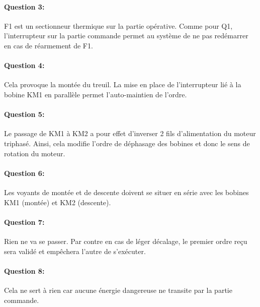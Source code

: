 \paragraph{Question 3:} F1 est un sectionneur thermique sur la partie opérative. Comme pour Q1, l'interrupteur sur la partie commande permet au système de ne pas redémarrer en cas de réarmement de F1.

\paragraph{Question 4:} Cela provoque la montée du treuil. La mise en place de l'interrupteur lié à la bobine KM1 en parallèle permet l'auto-maintien de l'ordre.

\paragraph{Question 5:} Le passage de KM1 à KM2 a pour effet d'inverser 2 fils d'alimentation du moteur triphasé. Ainsi, cela modifie l'ordre de déphasage des bobines et donc le sens de rotation du moteur.

\paragraph{Question 6:} Les voyants de montée et de descente doivent se situer en série avec les bobines KM1 (montée) et KM2 (descente).

\paragraph{Question 7:} Rien ne va se passer. Par contre en cas de léger décalage, le premier ordre reçu sera validé et empêchera l'autre de s'exécuter.

\paragraph{Question 8:} Cela ne sert à rien car aucune énergie dangereuse ne transite par la partie commande.


